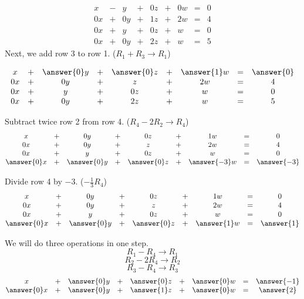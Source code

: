 \documentclass{ximera}
\begin{document}
\begin{exploration}
\begin{problem}
$$\begin{matrix}
      x &- &y&+&0z&+&0w&= &0 \\
	 0x& +&0y&+& 1z&+& 2w&=& 4\\
     0x& +&y&+&0z&+&w&=&0\\
     0x&+&0y&+&2z&+&w&=&5
    \end{matrix}$$
Next, we add row 3 to row 1. ($R_1+R_3\rightarrow R_1$)  
\begin{prompt}
 $$\begin{matrix}
      x &+ & \answer{0}y&+&\answer{0}z&+& \answer{1}w&= & \answer{0} \\
	 0x& +&0y&+&z&+&2w&=&4\\
     0x& +&y&+&0z&+&w&=&0\\
     0x&+&0y&+&2z&+&w&=&5
    \end{matrix}$$
\end{prompt} 
\begin{problem}
\begin{prompt} Subtract twice row 2 from row 4. ($R_4-2R_2\rightarrow R_4$)
$$\begin{matrix}
      x &+ &0y&+&0z&+&1w&= &0 \\
	 0x& +&0y&+&z&+&2w&=&4\\
     0x& +&y&+&0z&+&w&=&0\\
     \answer{0}x&+&\answer{0}y&+& \answer{0}z&+& \answer{-3}w&=& \answer{-3}
    \end{matrix}$$
\end{prompt}
\begin{problem}
\begin{prompt} Divide row 4 by $-3$. ($-\frac{1}{3}R_4$)
$$\begin{matrix}
      x &+ &0y&+&0z&+&1w&= &0 \\
	 0x& +&0y&+&z&+&2w&=&4\\
     0x& +&y&+&0z&+&w&=&0\\
     \answer{0}x&+&\answer{0}y&+&\answer{0}z&+& \answer{1}w&=&\answer{1}
    \end{matrix}$$
\end{prompt}    
\begin{problem}
\begin{prompt} We will do three operations in one step.
$$R_1-R_4\rightarrow R_1$$
$$R_2-2R_4\rightarrow R_2$$
$$R_3-R_4\rightarrow R_3$$
$$\begin{matrix}
      x &+ &\answer{0}y&+&\answer{0}z&+& \answer{0}w&= & \answer{-1} \\
	 \answer{0}x& +&\answer{0}y&+&\answer{1}z&+& \answer{0}w&=& \answer{2}\\

\end{matrix}$$
\end{prompt}
\end{problem}
\end{problem}
\end{problem}
\end{problem}
\end{exploration}
\end{document}
